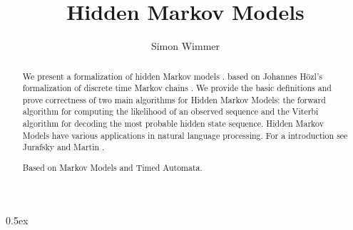 \documentclass[11pt,a4paper]{article}
\begin{document}
\title{Hidden Markov Models}
\author{Simon Wimmer}
\maketitle

\begin{abstract}
We present a formalization of hidden Markov models \cite{Markov13}.
based on Johannes Hözl's formalization of discrete time Markov chains \cite{hoelzl2017mdp}.
We provide the basic definitions and prove correctness of two main algorithms for
Hidden Markov Models: the forward algorithm for computing the likelihood of an observed sequence
and the Viterbi algorithm for decoding the most probable hidden state sequence.
Hidden Markov Models have various applications in natural language processing.
For a introduction see Jurafsky and Martin \cite{Jurafsky}.

Based on Markov Models \cite{hoelzl2017mdp} and Timed Automata.

\end{abstract}

\tableofcontents

\pagebreak

\parindent 0pt\parskip 0.5ex





\end{document}
